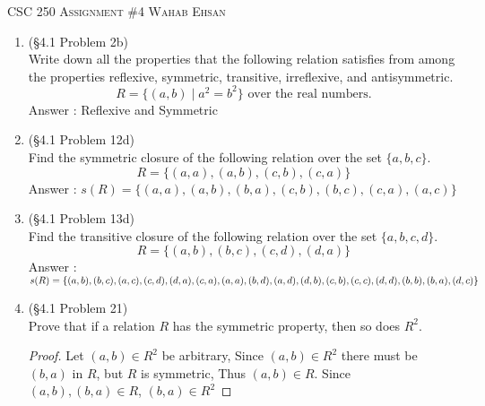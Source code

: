 \documentclass[12pt]{article}
\begin{document}
\begin{center}
\textsc{CSC 250 \qquad Assignment \#4 \qquad Wahab Ehsan}
\end{center}
\begin{enumerate}
\item (\S4.1 Problem 2b)\\
Write down all the properties that the following relation satisfies from among the properties reflexive, symmetric, transitive, irreflexive, and antisymmetric.
\[R=\{(a,b)\mid a^2=b^2\} \text{ over the real numbers.}\]
Answer : Reflexive and Symmetric 






\item (\S4.1 Problem 12d)\\
Find the symmetric closure of the following relation over the set $\{a,b,c\}$.
\[R=\{(a,a),(a,b),(c,b),(c,a)\}\]
Answer : $s(R)=\{(a,a),(a,b),(b,a),(c,b),(b,c),(c,a),(a,c)\} $











\item (\S4.1 Problem 13d)\\
Find the transitive closure of the following relation over the set $\{a,b,c,d\}$.
\[R=\{(a,b),(b,c),(c,d),(d,a)\}\]
Answer :\\ $s(R)=\{(a,b),(b,c),(a,c),(c,d),(d,a),(c,a),(a,a),(b,d),(a,d),(d,b),\\(c,b),(c,c),(d,d),(b,b),(b,a),(d,c)\} $











\item (\S4.1 Problem 21)\\
Prove that if a relation $R$ has the symmetric property, then so does $R^2$.
\begin{proof}
Let $(a,b) \in R^2$ be arbitrary,
Since $(a,b)\in R^2$ there must be $(b,a)$ in $R$, but $R$ is symmetric, Thus $(a,b)\in R$. Since $(a,b),(b,a)\in R$, $(b,a)\in R^2$ 


\end{proof}
\end{enumerate}
\end{document}
